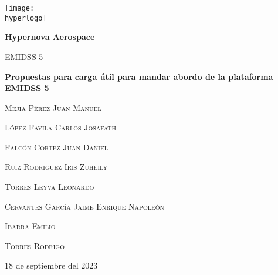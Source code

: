 \documentclass{article}%
\newcommand{\hyperlogo}{img/hyperlogo.png}
\newcommand{\practica}{Práctica n}%
\begin{document}
\begin{titlepage}
\centering
\texttt{[image: \\hyperlogo]}\par\vspace{1cm}
{\huge\bfseries{Hypernova Aerospace}}\par\vspace{0.4cm}
{\scshape{\large EMIDSS 5}}\par\vspace{3cm}
{\bfseries{\huge Propuestas para carga útil para mandar abordo de la plataforma EMIDSS 5}}\par\vspace{2cm}

\begin{flushleft}
\begin{tcolorbox}[enhanced jigsaw,breakable,pad at break*=1mm,
  colback=morado,colframe=white!25!black,title=\scshape\large Equipo asesorado por Ing. Edgar López Múzquiz,
  watermark color=white]
{\scshape\textcolor{blanco}{\normalsize Mejia Pérez Juan Manuel}}\par
{\scshape\textcolor{blanco}{\normalsize López Favila Carlos Josafath}}\par
{\scshape\textcolor{blanco}{\normalsize Falcón Cortez Juan Daniel}}\par
{\scshape\textcolor{blanco}{\normalsize Ruíz Rodríguez Iris Zuheily}}\par
{\scshape\textcolor{blanco}{\normalsize Torres Leyva Leonardo}}\par
{\scshape\textcolor{blanco}{\normalsize Cervantes García Jaime Enrique Napoleón}}\par
{\scshape\textcolor{blanco}{\normalsize Ibarra Emilio}}\par
{\scshape\textcolor{blanco}{\normalsize Torres Rodrigo}}\par
\end{tcolorbox}\par\vspace{1cm}
\vfill
\end{flushleft}
{\large 18 de septiembre del 2023}
\end{titlepage}
\clearpage
\end{document}
